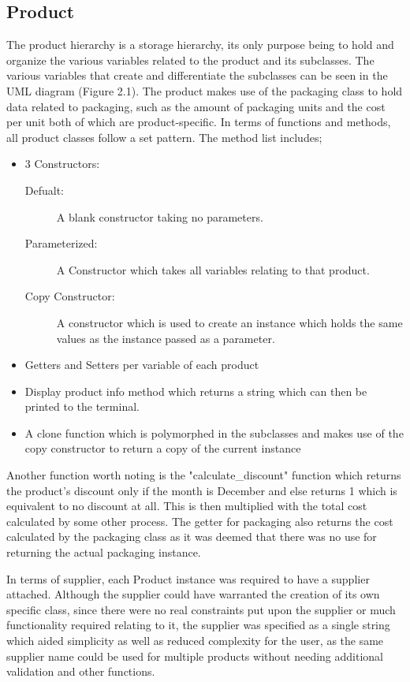 \documentclass[12pt, a4paper]{report}
\begin{document}
\subsection{Product}
The product hierarchy is a storage hierarchy, its only purpose being to hold and organize the various variables related to the product and its subclasses. The various variables that create and differentiate the subclasses can be seen in the UML diagram (Figure 2.1). The product makes use of the packaging class to hold data related to packaging, such as the amount of packaging units and the cost per unit both of which are product-specific. In terms of functions and methods, all product classes follow a set pattern. The method list includes;
\begin{itemize}
  \item 3 Constructors:
     \begin{description}
     \item[Defualt:] A blank constructor taking no parameters.
     \item[Parameterized:] A Constructor which takes all variables relating to that product.
     \item[Copy Constructor:] A constructor which is used to create an instance which holds the same values as the instance passed as a parameter.
     \end{description}
  \item Getters and Setters per variable of each product
  \item Display product info method which returns a string which can then be printed to the terminal.
  \item A clone function which is polymorphed in the subclasses and makes use of the copy constructor to return a copy of the current instance
\end{itemize}
Another function worth noting is the "calculate\_discount" function which returns the product's discount only if the month is December and else returns 1 which is equivalent to no discount at all. This is then multiplied with the total cost calculated by some other process. The getter for packaging also returns the cost calculated by the packaging class as it was deemed that there was no use for returning the actual packaging instance.

In terms of supplier, each Product instance was required to have a supplier attached. Although the supplier could have warranted the creation of its own specific class, since there were no real constraints put upon the supplier or much functionality required relating to it, the supplier was specified as a single string which aided simplicity as well as reduced complexity for the user, as the same supplier name could be used for multiple products without needing additional validation and other functions.
\end{document}
